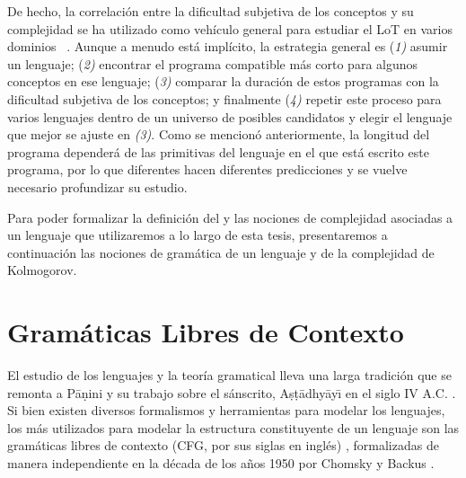De hecho, la correlación entre la dificultad subjetiva de los conceptos y su complejidad se ha utilizado como vehículo general para estudiar el LoT  en varios dominios ~\cite{piantadosi2016logical, leeuwenberg1971perceptual, amalric2017language, lupyan2007language}. Aunque a menudo está implícito, la estrategia general es (\textit{1)} asumir un lenguaje; (\textit{2)} encontrar el programa compatible más corto para algunos conceptos en ese lenguaje; (\textit{3)} comparar la duración de estos programas con la dificultad subjetiva de los conceptos; y finalmente (\textit{4)} repetir este proceso para varios lenguajes dentro de un universo de posibles candidatos y elegir el lenguaje que mejor se ajuste en \textit{(3)}. Como se mencionó anteriormente, la longitud del programa dependerá de las primitivas del lenguaje en el que está escrito este programa, por lo que diferentes \lot hacen diferentes predicciones y se vuelve necesario profundizar su estudio.

Para poder formalizar la definición del \lot y las nociones de complejidad asociadas a un lenguaje que utilizaremos a lo largo de esta tesis, presentaremos a continuación las nociones de gramática de un lenguaje y de la complejidad de Kolmogorov.

\section{Gramáticas Libres de Contexto}

El estudio de los lenguajes y la teoría gramatical lleva una larga tradición que se remonta a P{\=a}ṇini y su trabajo sobre el sánscrito, Aṣṭ{\=a}dhy{\=a}y{\=\i} en el siglo IV A.C. \cite{katre1989}. Si bien existen diversos formalismos y herramientas para modelar los lenguajes, los más utilizados para modelar la estructura constituyente de un lenguaje son las gramáticas libres de contexto (CFG, por sus siglas en inglés) \cite{keselj2009speech}, formalizadas de manera independiente en la década de los años 1950 por Chomsky \cite{chomsky1956three} y Backus \cite{backus1959syntax}.

